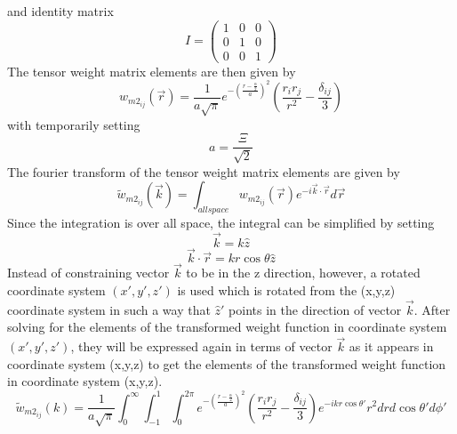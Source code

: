 \documentclass[12pt]{article}
\begin{document}
and identity matrix
\begin{equation}{I=\left(\begin{array}{ccc} 1 & 0 & 0 \\ 0 & 1 & 0 \\ 0 & 0 & 1 \end{array}\right)}\end{equation}
The tensor weight matrix elements are then given by
\begin{equation}{w_{m2_{ij}}(\vec{r})=\frac{1}{a\sqrt{\pi}}e^{-\left(\frac{r-\frac{\alpha}{2}}{a}\right)^2}\left(\frac{r_ir_j}{r^2}-\frac{\delta_{ij}}{3}\right)}\end{equation}
with temporarily setting
\begin{equation}{a=\frac{\Xi}{\sqrt{2}}}\end{equation}
The fourier transform of the tensor weight matrix elements are given by
\begin{equation}{\widetilde{w}_{m2_{ij}}(\vec{k})=\int_{allspace}{w_{{m2}_{ij}}}(\vec{r})e^{-i\vec{k}\cdot\vec{r}}d{\vec{r}}}\end{equation}
Since the integration is over all space, the integral can be simplified by setting 
\begin{equation}{\vec{k}=k\hat{z}}\end{equation}
\begin{equation}{\vec{k}\cdot\vec{r}=kr\cos\theta\hat{z}}\end{equation}
Instead of constraining vector $\vec{k}$ to be in the z direction, however, a rotated coordinate system $(x',y',z')$ is used which is rotated from the (x,y,z) coordinate system in such a way that $\hat{z}'$ points in the direction of vector $\vec{k}$. After solving for the elements of the transformed weight function in coordinate system $(x',y',z')$, they will be expressed again in terms of vector $\vec{k}$ as it appears in coordinate system (x,y,z) to get the elements of the transformed weight function in coordinate system (x,y,z).%
\begin{equation}{\widetilde{w}_{m2_{ij}}(k)=\frac{1}{a\sqrt{\pi}}\int_{0}^{\infty}\int_{-1}^{1}\int_{0}^{2\pi}e^{-\left(\frac{r-\frac{\alpha}{2}}{a}\right)^2}\left(\frac{r_ir_j}{r^2}-\frac{\delta_{ij}}{3}\right)e^{-ikr\cos\theta'}r^2d{r}d{\cos\theta'}d{\phi'}}\end{equation}
\end{document}
